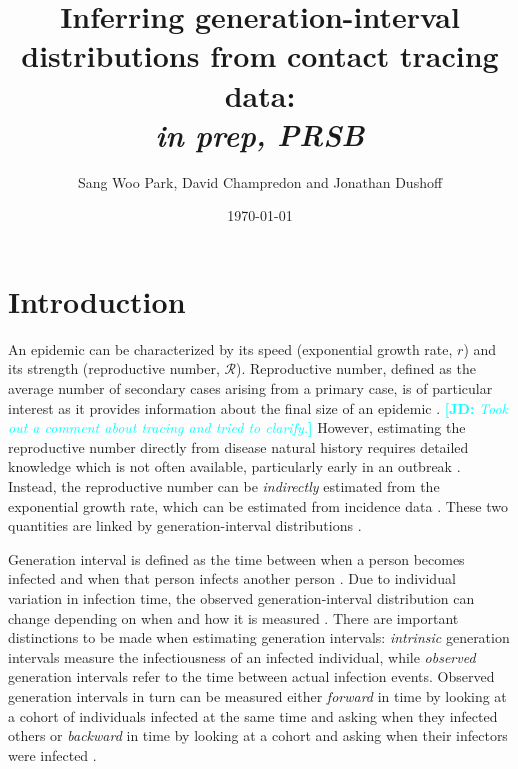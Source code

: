 \documentclass[12pt]{article}
\title{Inferring generation-interval distributions from contact tracing data: \\ \emph{in prep, PRSB}}
\author{Sang Woo Park, David Champredon and Jonathan Dushoff}
\date{\today}
\newcommand{\RR}{\ensuremath{{\mathcal R}}}
\newcommand{\comment}[3]{\textcolor{#1}{\textbf{[#2: }\textsl{#3}\textbf{]}}}
\newcommand{\jd}[1]{\comment{cyan}{JD}{#1}}
\begin{document}
\maketitle

\section{Introduction}


An epidemic can be characterized by its speed (exponential growth rate, $r$) and its strength (reproductive number, \RR).
Reproductive number, defined as the average number of secondary cases arising from a primary case, is of particular interest as it provides information about the final size of an epidemic \citep{anderson1991infectious, diekmann1990definition}.
\jd{Took out a comment about tracing and tried to clarify.}
However, estimating the reproductive number directly from disease natural history requires detailed knowledge which is not often available, particularly early in an outbreak \citep{dietz1993estimation}.
Instead, the reproductive number can be \emph{indirectly} estimated from the exponential growth rate, which can be estimated from incidence data \citep{chowell2003sars, mills2004transmissibility, nishiura2009transmission, nishiura2010pros, ma2014estimating}.
These two quantities are linked by generation-interval distributions \citep{wearing2005appropriate, svensson2007note, roberts2007model, wallinga2007generation, park2019practical}.

Generation interval is defined as the time between when a person becomes infected and when that person infects another person \citep{svensson2007note}.
Due to individual variation in infection time, the observed generation-interval distribution can change depending on when and how it is measured \citep{svensson2007note, kenah2008generation, nishiura2010time, champredon2015intrinsic}.
There are important distinctions to be made when estimating generation intervals: \emph{intrinsic} generation intervals measure the infectiousness of an infected individual,
while \emph{observed} generation intervals refer to the time between actual infection events.
Observed generation intervals in turn can be measured either \emph{forward} in time by looking at a cohort of individuals infected at the same time and asking when they infected others or \emph{backward} in time by looking at a cohort and asking when their infectors were infected \citep{champredon2015intrinsic}.
\end{document}

